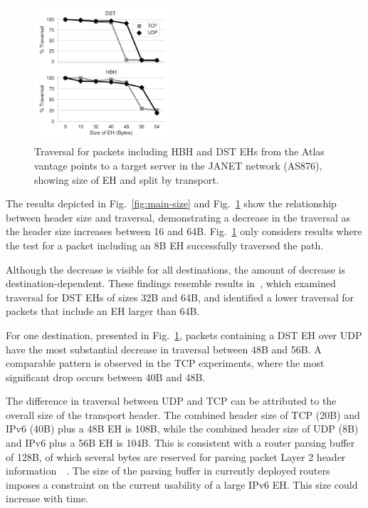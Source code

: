 \documentclass[conference]{IEEEtran}
\begin{document}
\begin{figure}[t]
\centering
  \includegraphics[width=0.45\textwidth]{sizes.png}
  \caption{Traversal for packets including HBH and DST EHs from the Atlas
vantage points to a target server in the JANET network (AS876), showing
size of EH and split by transport.  }

  \label{fig:sizes}
\end{figure}



The results depicted in Fig.~\ref{fig:main-size} and Fig.~\ref{fig:sizes} show the relationship between
header size and traversal, demonstrating a decrease in the traversal as the header size increases between 16 and 64B. 
Fig.~\ref{fig:sizes} only considers results where the test for a packet including an 8B EH successfully traversed the path.


Although the decrease is visible for all destinations, the amount of decrease is destination-dependent. These findings
resemble results in~\cite{james-imc}, which examined traversal
 for DST EHs of sizes 32B and 64B, and identified a lower traversal for
packets that include an EH larger than 64B.

For one destination, presented in Fig.~\ref{fig:sizes}, packets containing a DST EH over UDP have the
most substantial decrease in traversal between 48B and 56B. A
comparable pattern is observed in the TCP experiments, where the most significant drop occurs between 40B and 48B. 


The difference in traversal between UDP and TCP can be attributed to the overall
size of the transport header.  The combined header size of TCP (20B) and IPv6
(40B) plus a 48B EH is 108B, while the combined header size of UDP (8B) and IPv6
plus a 56B EH is 104B. 
This is consistent with a router parsing buffer of 128B, of which several bytes are reserved for parsing packet Layer 2 header information~\cite{apnic-buffers}~\cite{ietf-6man-eh-limits-04}.
The size of the parsing buffer in currently deployed routers imposes a
constraint on the current usability of a large IPv6 EH. This size could increase with time.
\end{document}
